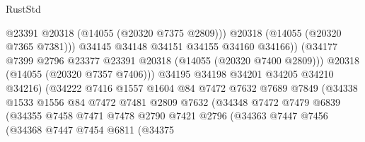 \begin{lexlean}{RustStd}
\begin{coremodule}
                                        @23391
                                        @20318
                                        (@14055 (@20320 @7375 @2809)))
                                      @20318
                                      (@14055 (@20320 @7365 @7381)))
                                    @34145
                                    @34148
                                    @34151
                                    @34155
                                    @34160
                                    @34166))
                                (@34177
                                  @7399
                                  @2796
                                  @23377
                                  @23391
                                  @20318
                                  (@14055 (@20320 @7400 @2809)))
                                @20318
                                (@14055 (@20320 @7357 @7406)))
                              @34195
                              @34198
                              @34201
                              @34205
                              @34210
                              @34216)
                            (@34222
                              @7416
                              @1557
                              @1604
                              @84
                              @7472
                              @7632
                              @7689
                              @7849
                              (@34338
                                @1533
                                @1556
                                @84
                                @7472
                                @7481
                                @2809
                                @7632
                                (@34348
                                  @7472
                                  @7479
                                  @6839
                                  (@34355
                                    @7458
                                    @7471
                                    @7478
                                    @2790
                                    @7421
                                    @2796
                                    (@34363
                                      @7447
                                      @7456
                                      (@34368
                                        @7447
                                        @7454
                                        @6811
                                        (@34375

\end{coremodule}
\end{lexlean}
